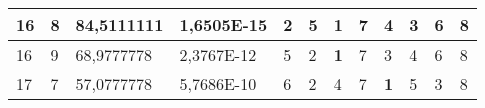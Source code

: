 \documentclass[conference]{IEEEtran}
\begin{document}
\begin{table*}[]
\begin{tabular}{|llll|llllllll|}
\multicolumn{1}{|l|}{16}                                                    & \multicolumn{1}{l|}{8}                                                        & \multicolumn{1}{l|}{84,5111111}                                                   & 1,6505E-15                     & \multicolumn{1}{l|}{2}                                                  & \multicolumn{1}{l|}{5}                                                  & \multicolumn{1}{l|}{\textbf{1}}                                         & \multicolumn{1}{l|}{7}                                                  & \multicolumn{1}{l|}{4}                                                  & \multicolumn{1}{l|}{3}                                                  & \multicolumn{1}{l|}{6}                                                  & 8                          \\ \hline
\multicolumn{1}{|l|}{16}                                                    & \multicolumn{1}{l|}{9}                                                        & \multicolumn{1}{l|}{68,9777778}                                                   & 2,3767E-12                     & \multicolumn{1}{l|}{5}                                                  & \multicolumn{1}{l|}{2}                                                  & \multicolumn{1}{l|}{\textbf{1}}                                         & \multicolumn{1}{l|}{7}                                                  & \multicolumn{1}{l|}{3}                                                  & \multicolumn{1}{l|}{4}                                                  & \multicolumn{1}{l|}{6}                                                  & 8                          \\ \hline
\multicolumn{1}{|l|}{17}                                                    & \multicolumn{1}{l|}{7}                                                        & \multicolumn{1}{l|}{57,0777778}                                                   & 5,7686E-10                     & \multicolumn{1}{l|}{6}                                                  & \multicolumn{1}{l|}{2}                                                  & \multicolumn{1}{l|}{4}                                                  & \multicolumn{1}{l|}{7}                                                  & \multicolumn{1}{l|}{\textbf{1}}                                         & \multicolumn{1}{l|}{5}                                                  & \multicolumn{1}{l|}{3}                                                  & 8                          \\ \hline

\end{tabular}
\end{table*}
\end{document}
